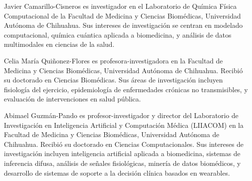 \documentclass[journal,twoside,web]{ieeecolor}
\begin{document}
\begin{IEEEbiographynophoto}{Javier Camarillo-Cisneros} es investigador en el Laboratorio de Química Física Computacional de la Facultad de Medicina y Ciencias Biomédicas, Universidad Autónoma de Chihuahua. Sus intereses de investigación se centran en modelado computacional, química cuántica aplicada a biomedicina, y análisis de datos multimodales en ciencias de la salud.
\end{IEEEbiographynophoto}

\begin{IEEEbiographynophoto}{Celia María Quiñonez-Flores} es profesora-investigadora en la Facultad de Medicina y Ciencias Biomédicas, Universidad Autónoma de Chihuahua. Recibió su doctorado en Ciencias Biomédicas. Sus áreas de investigación incluyen fisiología del ejercicio, epidemiología de enfermedades crónicas no transmisibles, y evaluación de intervenciones en salud pública.
\end{IEEEbiographynophoto}

\begin{IEEEbiographynophoto}{Abimael Guzmán-Pando} es profesor-investigador y director del Laboratorio de Investigación en Inteligencia Artificial y Computación Médica (LIIACOM) en la Facultad de Medicina y Ciencias Biomédicas, Universidad Autónoma de Chihuahua. Recibió su doctorado en Ciencias Computacionales. Sus intereses de investigación incluyen inteligencia artificial aplicada a biomedicina, sistemas de inferencia difusa, análisis de señales fisiológicas, minería de datos biomédicos, y desarrollo de sistemas de soporte a la decisión clínica basados en wearables.
\end{IEEEbiographynophoto}
\end{document}
